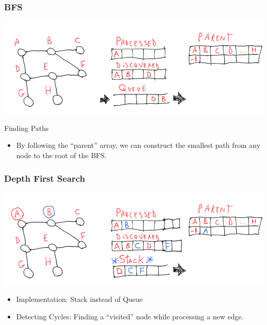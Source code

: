 \documentclass{beamer}
\begin{document}
\begin{frame}
  \frametitle{BFS}
  \begin{center}
    \includegraphics[height=0.4\textheight]{bfs}
  \end{center}
  \begin{block}{Finding Paths}
    \begin{itemize}
    \item By following the ``parent'' array, we can construct the
      smallest path from any node to the root of the BFS.
    \end{itemize}
  \end{block}
\end{frame}

\begin{frame}
  \frametitle{Depth First Search}
  \begin{center}
    \includegraphics[height=0.4\textheight]{dfs}
  \end{center}
  \begin{block}{}
    \begin{itemize}
      \item Implementation: Stack instead of Queue
      \item Detecting Cycles: Finding a ``visited'' node while
        processing a new edge.
    \end{itemize}    
  \end{block}
\end{frame}
\end{document}
